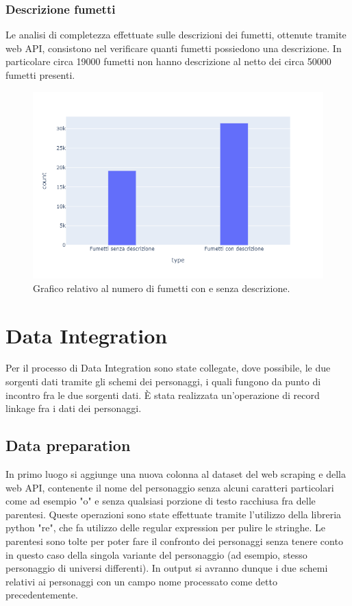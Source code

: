 \documentclass[
12pt, %
a4paper, %
oneside, %
headinclude,footinclude, %
BCOR5mm, %
]{scrartcl}
\begin{document}
\subsubsection{Descrizione fumetti}
Le analisi di completezza effettuate sulle descrizioni dei fumetti, ottenute tramite web API, consistono nel verificare quanti fumetti possiedono una descrizione. In particolare circa 19000 fumetti non hanno descrizione al netto dei circa 50000 fumetti presenti.
\begin{figure}[H]
  \includegraphics[scale=0.5]{plot_descrizione_fumetti.png}
  \caption{Grafico relativo al numero di fumetti con e senza descrizione.}
\end{figure}
\section{Data Integration}
Per il processo di Data Integration sono state collegate, dove possibile, le due sorgenti dati tramite gli schemi dei personaggi, i quali fungono da punto di incontro fra le due sorgenti dati. È stata realizzata un'operazione di record linkage fra i dati dei personaggi.
\subsection{Data preparation}
In primo luogo si aggiunge una nuova colonna al dataset del web scraping e della web API, contenente il nome del personaggio senza alcuni caratteri particolari come ad esempio "o" e senza qualsiasi porzione di testo racchiusa fra delle parentesi. Queste operazioni sono state effettuate tramite l'utilizzo della libreria python "re", che fa utilizzo delle regular expression per pulire le stringhe. Le parentesi sono tolte per poter fare il confronto dei personaggi senza tenere conto in questo caso della singola variante del personaggio (ad esempio, stesso personaggio di universi differenti). In output si avranno dunque i due schemi relativi ai personaggi con un campo nome processato come detto precedentemente.
\end{document}
